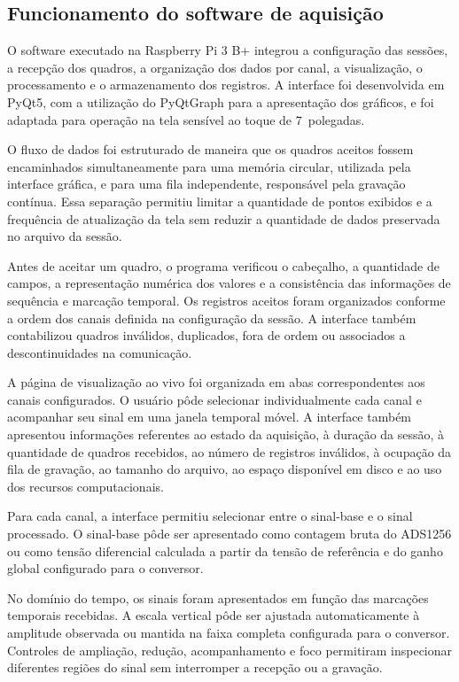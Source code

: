\documentclass[a4paper,12pt]{fcte}
\begin{document}
\subsection{Funcionamento do software de aquisição}
\label{subsec:resultado_software}

O software executado na Raspberry Pi 3 B+ integrou a configuração das sessões, a recepção dos quadros, a organização dos dados por canal, a visualização, o processamento e o armazenamento dos registros. A interface foi desenvolvida em PyQt5, com a utilização do PyQtGraph para a apresentação dos gráficos, e foi adaptada para operação na tela sensível ao toque de 7~polegadas.

O fluxo de dados foi estruturado de maneira que os quadros aceitos fossem encaminhados simultaneamente para uma memória circular, utilizada pela interface gráfica, e para uma fila independente, responsável pela gravação contínua. Essa separação permitiu limitar a quantidade de pontos exibidos e a frequência de atualização da tela sem reduzir a quantidade de dados preservada no arquivo da sessão.

Antes de aceitar um quadro, o programa verificou o cabeçalho, a quantidade de campos, a representação numérica dos valores e a consistência das informações de sequência e marcação temporal. Os registros aceitos foram organizados conforme a ordem dos canais definida na configuração da sessão. A interface também contabilizou quadros inválidos, duplicados, fora de ordem ou associados a descontinuidades na comunicação.

A página de visualização ao vivo foi organizada em abas correspondentes aos canais configurados. O usuário pôde selecionar individualmente cada canal e acompanhar seu sinal em uma janela temporal móvel. A interface também apresentou informações referentes ao estado da aquisição, à duração da sessão, à quantidade de quadros recebidos, ao número de registros inválidos, à ocupação da fila de gravação, ao tamanho do arquivo, ao espaço disponível em disco e ao uso dos recursos computacionais.

Para cada canal, a interface permitiu selecionar entre o sinal-base e o sinal processado. O sinal-base pôde ser apresentado como contagem bruta do ADS1256 ou como tensão diferencial calculada a partir da tensão de referência e do ganho global configurado para o conversor.

No domínio do tempo, os sinais foram apresentados em função das marcações temporais recebidas. A escala vertical pôde ser ajustada automaticamente à amplitude observada ou mantida na faixa completa configurada para o conversor. Controles de ampliação, redução, acompanhamento e foco permitiram inspecionar diferentes regiões do sinal sem interromper a recepção ou a gravação.
\end{document}
